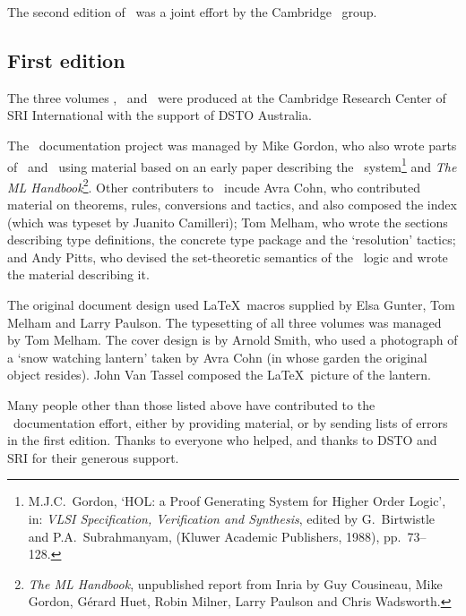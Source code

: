 The second edition of \REFERENCE\ was a joint effort by the Cambridge
\HOL\ group.

\subsection*{First edition}

The three volumes \TUTORIAL, \DESCRIPTION\ and \REFERENCE\ were
produced at the Cambridge Research Center of SRI International with
the support of DSTO Australia.

The \HOL\ documentation project was managed by Mike Gordon, who also
wrote parts of \DESCRIPTION\ and \TUTORIAL\ using material based on an
early paper describing the \HOL\ system\footnote{M.J.C.\ Gordon, `HOL:
  a Proof Generating System for Higher Order Logic', in: {\it VLSI
    Specification, Verification and Synthesis\/}, edited by G.\
  Birtwistle and P.A.\ Subrahmanyam, (Kluwer Academic Publishers,
  1988), pp.\ 73--128.} and {\sl The ML Handbook\/}\footnote{{\sl The
    ML Handbook}, unpublished report from Inria by Guy Cousineau, Mike
  Gordon, G\'erard Huet, Robin Milner, Larry Paulson and Chris
  Wadsworth.}.  Other contributers to \DESCRIPTION\ incude Avra Cohn,
who contributed material on theorems, rules, conversions and tactics,
and also composed the index (which was typeset by Juanito Camilleri);
Tom Melham, who wrote the sections describing type definitions, the
concrete type package and the `resolution' tactics; and Andy Pitts,
who devised the set-theoretic semantics of the \HOL\ logic and wrote
the material describing it.

The original document design used \LaTeX\ macros supplied by Elsa
Gunter, Tom Melham and Larry Paulson.  The typesetting of all three
volumes was managed by Tom Melham.  The cover design is by Arnold
Smith, who used a photograph of a `snow watching lantern' taken by
Avra Cohn (in whose garden the original object resides).  John Van
Tassel composed the \LaTeX\ picture of the lantern.

Many people other than those listed above have contributed to the
\HOL\ documentation effort, either by providing material, or by
sending lists of errors in the first edition.  Thanks to everyone who
helped, and thanks to DSTO and SRI for their generous support.






